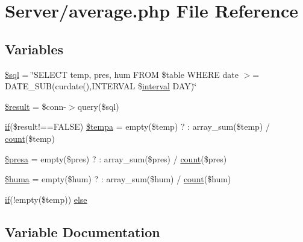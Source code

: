 \hypertarget{average_8php}{}\section{Server/average.php File Reference}
\label{average_8php}
\subsection*{Variables}
\begin{DoxyCompactItemize}
\item 
\hyperlink{average_8php_a047170d6020a882807665812a27e2525}{\$sql} = \char`\"{}S\+E\+L\+E\+CT temp, pres, hum F\+R\+OM \$table W\+H\+E\+RE date $>$= D\+A\+T\+E\+\_\+\+S\+UB(curdate(),I\+N\+T\+E\+R\+V\+AL \$\hyperlink{_w_s_8ino_ae0c690118932b32ef40a74bb6a259acd}{interval} D\+AY)\char`\"{}
\item 
\hyperlink{average_8php_a112ef069ddc0454086e3d1e6d8d55d07}{\$result} = \$conn-\/$>$query(\$sql)
\item 
\hyperlink{index_8php_a5bd83a7a52ff3be468b16a8c82e43673}{if}(\$result!==F\+A\+L\+SE) \hyperlink{average_8php_a8923948fae95ff6dc6ed7e7df3446854}{\$tempa} = empty(\$temp) ? \textquotesingle{}\textquotesingle{} \+: array\+\_\+sum(\$temp) / \hyperlink{_w_s_8ino_ad43c3812e6d13e0518d9f8b8f463ffcf}{count}(\$temp)
\item 
\hyperlink{average_8php_a2b0df464a962196e7245f2c46057ba1a}{\$presa} = empty(\$pres) ? \textquotesingle{}\textquotesingle{} \+: array\+\_\+sum(\$pres) / \hyperlink{_w_s_8ino_ad43c3812e6d13e0518d9f8b8f463ffcf}{count}(\$pres)
\item 
\hyperlink{average_8php_a29dc8b646ccc31d3f81aa1a74581e018}{\$huma} = empty(\$hum) ? \textquotesingle{}\textquotesingle{} \+: array\+\_\+sum(\$hum) / \hyperlink{_w_s_8ino_ad43c3812e6d13e0518d9f8b8f463ffcf}{count}(\$hum)
\item 
\hyperlink{index_8php_a5bd83a7a52ff3be468b16a8c82e43673}{if}(!empty(\$temp)) \hyperlink{average_8php_a5e911e6d95c6980d50f6cba065d73dc1}{else}
\end{DoxyCompactItemize}


\subsection{Variable Documentation}
\mbox{\label{average_8php_a29dc8b646ccc31d3f81aa1a74581e018}} 

